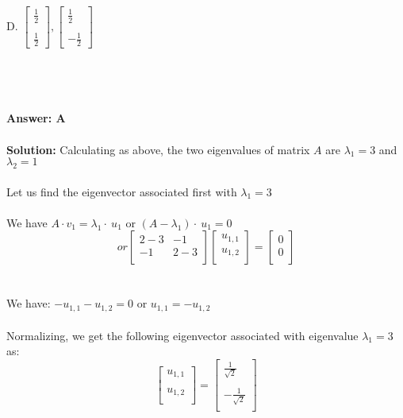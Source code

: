 \documentclass[prl,twocolumn,showpacs,preprintnumbers,superscriptaddress]{revtex4}
\theoremstyle{plain}
\theoremstyle{definition}
\begin{document}
\begin{widetext}
{\\
\\
D. {\Large $\begin{bmatrix}   \frac{1}{2} \\ \\ \frac{1}{2} \end{bmatrix} ,  \begin{bmatrix}  \frac{1}{2} \\ \\ -\frac{1}{2} \end{bmatrix}$ }\\
\\
\\
\\
\\
\textbf{Answer: A}
\\
\\
\textbf{Solution:}
Calculating as above, the two eigenvalues of matrix $A$ are $\lambda_{1} = 3$ and $\lambda_{2} = 1$
\\
\\
Let us find the eigenvector associated first with $\lambda_{1} = 3$
\\
\\
We have $A \cdot v_{1} = \lambda_{1} \cdot \ u_{1}$ or $(A - \lambda_{1}) \cdot \ u_{1} = 0$
\\
\[ or
\begin{bmatrix}    2 - 3 & -1 \\     -1 & 2 - 3   \\ \end{bmatrix} \begin{bmatrix}    u_{1,1} \\     u_{1,2}  \\ \end{bmatrix}= \begin{bmatrix}    0 \\     0  \\ \end{bmatrix}
\]
\\
\\
We have: $-u_{1,1} - u_{1,2} = 0$ or $u_{1,1} = - u_{1,2}$
\\
\\
Normalizing, we get the following eigenvector associated with eigenvalue $\lambda_{1} = 3$ as:
\\
\[
\begin{bmatrix}    u_{1,1} \\  \\   u_{1,2}  \\ \end{bmatrix}= \begin{bmatrix}    \frac{1}{\sqrt{2}} \\   \\  -\frac{1}{\sqrt{2}}  \\ \end{bmatrix}
\]}
\end{widetext}
\end{document}
